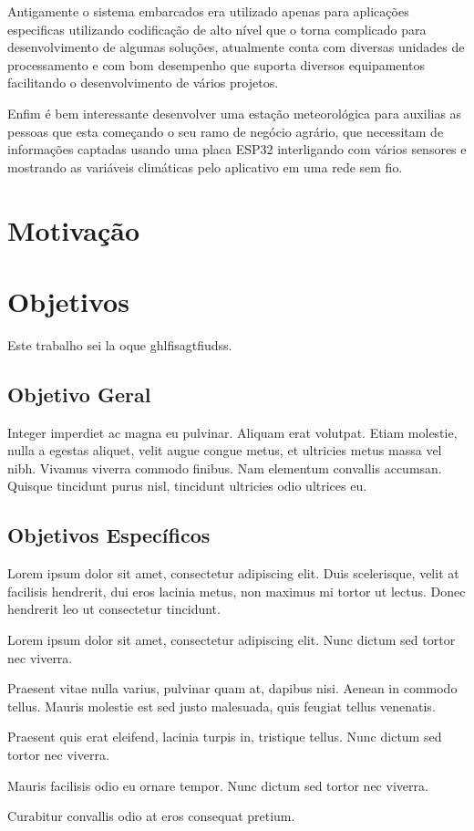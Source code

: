 Antigamente o sistema embarcados era utilizado apenas para aplicações especificas utilizando codificação de alto nível que o torna complicado para desenvolvimento de algumas soluções, atualmente conta com diversas unidades de processamento e com bom desempenho que suporta diversos equipamentos facilitando o desenvolvimento de vários projetos.  

Enfim é bem interessante desenvolver uma estação meteorológica para auxilias as pessoas que esta começando o seu ramo de negócio agrário, que necessitam de informações captadas usando uma placa  ESP32 interligando com vários sensores e mostrando as variáveis climáticas pelo aplicativo em uma rede sem fio. 




\section{Motivação}
\label{sec:motivacao}



\section{Objetivos}
\label{sec:objetivos}

Este trabalho sei la oque ghlfisagtfiudss.

\subsection{Objetivo Geral}
\label{sec:objetivo-geral}

Integer imperdiet ac magna eu pulvinar. Aliquam erat volutpat. Etiam molestie, nulla a egestas aliquet, velit augue congue metus, et ultricies metus massa vel nibh. Vivamus viverra commodo finibus. Nam elementum convallis accumsan. Quisque tincidunt purus nisl, tincidunt ultricies odio ultrices eu.

\subsection{Objetivos Específicos}
\label{sec:objetivos-especificos}

Lorem ipsum dolor sit amet, consectetur adipiscing elit. Duis scelerisque, velit at facilisis hendrerit, dui eros lacinia metus, non maximus mi tortor ut lectus. Donec hendrerit leo ut consectetur tincidunt. 

	\begin{alineas}
		\item Lorem ipsum dolor sit amet, consectetur adipiscing elit. Nunc dictum sed tortor nec viverra.
		\item Praesent vitae nulla varius, pulvinar quam at, dapibus nisi. Aenean in commodo tellus. Mauris molestie est sed justo malesuada, quis feugiat tellus venenatis.
		\item Praesent quis erat eleifend, lacinia turpis in, tristique tellus. Nunc dictum sed tortor nec viverra.
		\item Mauris facilisis odio eu ornare tempor. Nunc dictum sed tortor nec viverra.
		\item Curabitur convallis odio at eros consequat pretium.
	\end{alineas}
